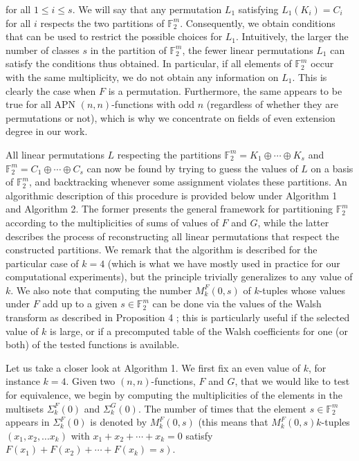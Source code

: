 \documentclass[10pt]{article}
\begin{document}
for all $1 \leq i \leq s$. We will say that any permutation $L_{1}$ satisfying $L_{1}\left(K_{i}\right)=C_{i}$ for all $i$ respects the two partitions of $\mathbb{F}_{2}^{m}$. Consequently, we obtain conditions that can be used to restrict the possible choices for $L_{1}$. Intuitively, the larger the number of classes $s$ in the partition of $\mathbb{F}_{2}^{m}$, the fewer linear permutations $L_{1}$ can satisfy the conditions thus obtained. In particular, if all elements of $\mathbb{F}_{2}^{m}$ occur with the same multiplicity, we do not obtain any information on $L_{1}$. This is clearly the case when $F$ is a permutation. Furthermore, the same appears to be true for all APN $(n, n)$-functions with odd $n$ (regardless of whether they are permutations or not), which is why we concentrate on fields of even extension degree in our work.

All linear permutations $L$ respecting the partitions $\mathbb{F}_{2}^{m}=K_{1} \oplus \cdots \oplus K_{s}$ and $\mathbb{F}_{2}^{m}= C_{1} \oplus \cdots \oplus C_{s}$ can now be found by trying to guess the values of $L$ on a basis of $\mathbb{F}_{2}^{m}$, and backtracking whenever some assignment violates these partitions. An algorithmic description of this procedure is provided below under Algorithm 1 and Algorithm 2. The former presents the general framework for partitioning $\mathbb{F}_{2}^{m}$ according to the multiplicities of sums of values of $F$ and $G$, while the latter describes the process of reconstructing all linear permutations that respect the constructed partitions. We remark that the algorithm is described for the particular case of $k=4$ (which is what we have mostly used in practice for our computational experiments), but the principle trivially generalizes to any value of $k$. We also note that computing the number $M_{k}^{F}(0, s)$ of $k$-tuples whose values under $F$ add up to a given $s \in \mathbb{F}_{2}^{m}$ can be done via the values of the Walsh transform as described in Proposition 4 ; this is particularly useful if the selected value of $k$ is large, or if a precomputed table of the Walsh coefficients for one (or both) of the tested functions is available.

Let us take a closer look at Algorithm 1. We first fix an even value of $k$, for instance $k=4$. Given two $(n, n)$-functions, $F$ and $G$, that we would like to test for equivalence, we begin by computing the multiplicities of the elements in the multisets $\Sigma_{k}^{F}(0)$ and $\Sigma_{k}^{G}(0)$. The number of times that the element $s \in \mathbb{F}_{2}^{m}$ appears in $\Sigma_{k}^{F}(0)$ is denoted by $M_{k}^{F}(0, s)$ (this means that $M_{k}^{F}(0, s) k$-tuples $\left(x_{1}, x_{2}, \ldots x_{k}\right)$ with $x_{1}+x_{2}+\cdots+x_{k}=0$ satisfy $\left.F\left(x_{1}\right)+F\left(x_{2}\right)+\cdots+F\left(x_{k}\right)=s\right)$.
\end{document}
